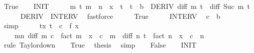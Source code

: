 \begin{isabellebody}
\ True\isanewline
\ \ \isamarkupfalse%
\ INIT\isanewline
\ \ \isamarkupfalse%
\ \isamarkupfalse%
\ {\isachardoublequoteopen}{\isasymforall}m\ t{\isachardot}{\kern0pt}\ m\ {\isacharless}{\kern0pt}\ n\ {\isasymand}\ x\ {\isasymle}\ t\ {\isasymand}\ t\ {\isasymle}\ b\ {\isasymlongrightarrow}\ DERIV\ {\isacharparenleft}{\kern0pt}diff\ m{\isacharparenright}{\kern0pt}\ t\ {\isacharcolon}{\kern0pt}{\isachargreater}{\kern0pt}\ diff\ {\isacharparenleft}{\kern0pt}Suc\ m{\isacharparenright}{\kern0pt}\ t{\isachardoublequoteclose}\isanewline
\ \ \ \ \isamarkupfalse%
\ DERIV\ \ INTERV\ \isamarkupfalse%
\ fastforce\isanewline
\ \ \isamarkupfalse%
\ \isamarkupfalse%
\ True\isanewline
\ \ \isamarkupfalse%
\ \isamarkupfalse%
\ INTERV\ \isamarkupfalse%
\ {\isachardoublequoteopen}c\ {\isasymle}\ b{\isachardoublequoteclose}\isanewline
\ \ \ \ \isamarkupfalse%
\ simp\isanewline
\ \ \isamarkupfalse%
\ \isamarkupfalse%
\ {\isachardoublequoteopen}{\isasymexists}t{\isachargreater}{\kern0pt}x{\isachardot}{\kern0pt}\ t\ {\isacharless}{\kern0pt}\ c\ {\isasymand}\ f\ x\ {\isacharequal}{\kern0pt}\isanewline
\ \ \ \ {\isacharparenleft}{\kern0pt}{\isasymSum}m{\isacharless}{\kern0pt}n{\isachardot}{\kern0pt}\ diff\ m\ c\ {\isacharslash}{\kern0pt}\ {\isacharparenleft}{\kern0pt}fact\ m{\isacharparenright}{\kern0pt}\ {\isacharasterisk}{\kern0pt}\ {\isacharparenleft}{\kern0pt}x\ {\isacharminus}{\kern0pt}\ c{\isacharparenright}{\kern0pt}\ {\isacharcircum}{\kern0pt}\ m{\isacharparenright}{\kern0pt}\ {\isacharplus}{\kern0pt}\ diff\ n\ t\ {\isacharslash}{\kern0pt}\ {\isacharparenleft}{\kern0pt}fact\ n{\isacharparenright}{\kern0pt}\ {\isacharasterisk}{\kern0pt}\ {\isacharparenleft}{\kern0pt}x\ {\isacharminus}{\kern0pt}\ c{\isacharparenright}{\kern0pt}\ {\isacharcircum}{\kern0pt}\ n{\isachardoublequoteclose}\isanewline
\ \ \ \ \isamarkupfalse%
\ {\isacharparenleft}{\kern0pt}rule\ Taylor{\isacharunderscore}{\kern0pt}down{\isacharparenright}{\kern0pt}\isanewline
\ \ \isamarkupfalse%
\ True\ \isamarkupfalse%
\ {\isacharquery}{\kern0pt}thesis\ \isamarkupfalse%
\ simp\isanewline
{}\isamarkupfalse%
\isanewline
\ \ \isamarkupfalse%
\ False\isanewline
\ \ \isamarkupfalse%
\ INIT\isanewline
\ \ \isamarkupfalse%
\ \isamarkupfalse%

\end{isabellebody}

